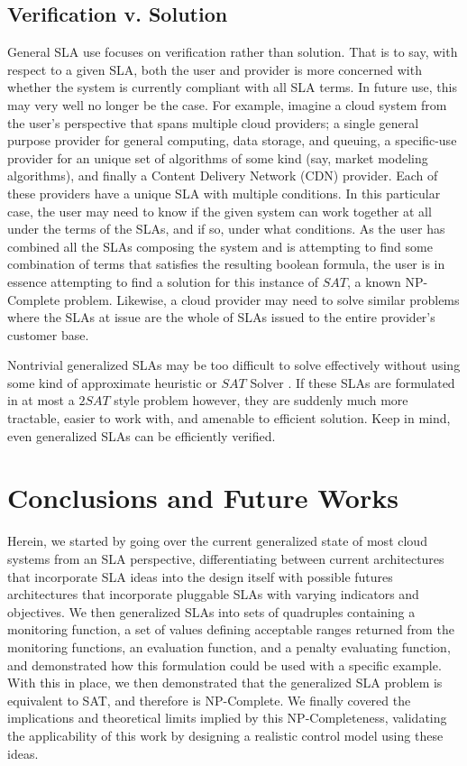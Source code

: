 \documentclass[a4paper,twoside]{article}
\begin{document}
\subsection{Verification v. Solution}
General SLA use focuses on verification rather than solution.  That is to say, with respect to a given SLA, both the user and provider is more concerned with whether the system is currently compliant with all SLA terms.  In future use, this may very well no longer be the case.  For example, imagine a cloud system from the user's perspective that spans multiple cloud providers; a single general purpose provider for general computing, data storage, and queuing, a specific-use provider for an unique set of algorithms of some kind (say, market modeling algorithms), and finally a Content Delivery Network (CDN) provider.  Each of these providers have a unique SLA with multiple conditions.  In this particular case, the user may need to know if the given system can work together at all under the terms of the SLAs, and if so, under what conditions.  As the user has combined all the SLAs composing the system and is attempting to find some combination of terms that satisfies the resulting boolean formula, the user is in essence attempting to find a solution for this instance of $ SAT $, a known NP-Complete problem.  Likewise, a cloud provider may need to solve similar problems where the SLAs at issue are the whole of SLAs issued to the entire provider's customer base.

Nontrivial generalized SLAs may be too difficult to solve effectively without using some kind of approximate heuristic or $ SAT $ Solver \cite{Hochbaum:1996:AAN:241938,ctrl:satcompetition}.  If these SLAs are formulated in at most a $ 2SAT $ style problem however, they are suddenly much more tractable, easier to work with, and amenable to efficient solution.  Keep in mind, even generalized SLAs can be efficiently verified.

\section{Conclusions and Future Works}
\noindent Herein, we started by going over the current generalized state of most cloud systems from an SLA perspective, differentiating between current architectures that incorporate SLA ideas into the design itself with possible futures architectures that incorporate pluggable SLAs with varying indicators and objectives.  We then generalized SLAs into sets of quadruples containing a monitoring function, a set of values defining acceptable ranges returned from the monitoring functions, an evaluation function, and a penalty evaluating function, and demonstrated how this formulation could be used with a specific example.  With this in place, we then demonstrated that the generalized SLA problem is equivalent to SAT, and therefore is NP-Complete.  We finally covered the implications and theoretical limits implied by this NP-Completeness, validating the applicability of this work by designing a realistic control model using these ideas.
\end{document}
